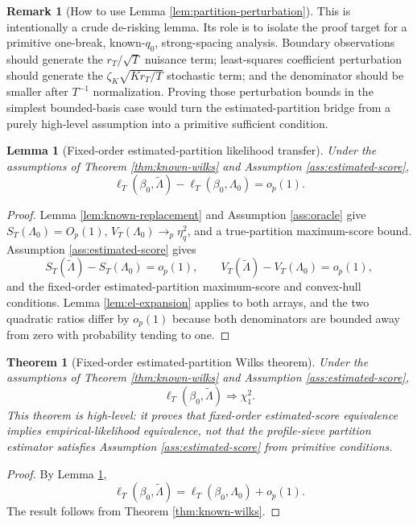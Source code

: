 \documentclass[12pt]{article}
\numberwithin{equation}{section}
\newtheorem{theorem}{Theorem}
\newtheorem{lemma}{Lemma}
\theoremstyle{definition}
\newtheorem{remark}{Remark}
\begin{document}
\begin{remark}[How to use Lemma \ref{lem:partition-perturbation}]
This is intentionally a crude de-risking lemma. Its role is to isolate the proof target for a primitive one-break, known-\(q_0\), strong-spacing analysis. Boundary observations should generate the \(r_T/\sqrt T\) nuisance term; least-squares coefficient perturbation should generate the \(\zeta_K\sqrt{K r_T/T}\) stochastic term; and the denominator should be smaller after \(T^{-1}\) normalization. Proving those perturbation bounds in the simplest bounded-basis case would turn the estimated-partition bridge from a purely high-level assumption into a primitive sufficient condition.
\end{remark}

\begin{lemma}[Fixed-order estimated-partition likelihood transfer]
\label{lem:estimated-transfer}
Under the assumptions of Theorem \ref{thm:known-wilks} and Assumption \ref{ass:estimated-score},
\[
    \ell_T(\beta_0,\widetilde\Lambda)
    -
    \ell_T(\beta_0,\Lambda_0)
    =o_p(1).
\]
\end{lemma}

\begin{proof}
Lemma \ref{lem:known-replacement} and Assumption \ref{ass:oracle} give \(S_T(\Lambda_0)=O_p(1)\), \(V_T(\Lambda_0)\to_p\eta_q^2\), and a true-partition maximum-score bound. Assumption \ref{ass:estimated-score} gives
\[
    S_T(\widetilde\Lambda)-S_T(\Lambda_0)=o_p(1),
    \qquad
    V_T(\widetilde\Lambda)-V_T(\Lambda_0)=o_p(1),
\]
and the fixed-order estimated-partition maximum-score and convex-hull conditions. Lemma \ref{lem:el-expansion} applies to both arrays, and the two quadratic ratios differ by \(o_p(1)\) because both denominators are bounded away from zero with probability tending to one.
\end{proof}

\begin{theorem}[Fixed-order estimated-partition Wilks theorem]
\label{thm:estimated-equiv}
Under the assumptions of Theorem \ref{thm:known-wilks} and Assumption \ref{ass:estimated-score},
\[
    \ell_T(\beta_0,\widetilde\Lambda)\Rightarrow\chi_1^2.
\]
This theorem is high-level: it proves that fixed-order estimated-score equivalence implies empirical-likelihood equivalence, not that the profile-sieve partition estimator satisfies Assumption \ref{ass:estimated-score} from primitive conditions.
\end{theorem}

\begin{proof}
By Lemma \ref{lem:estimated-transfer},
\[
    \ell_T(\beta_0,\widetilde\Lambda)
    =
    \ell_T(\beta_0,\Lambda_0)+o_p(1).
\]
The result follows from Theorem \ref{thm:known-wilks}.
\end{proof}
\end{document}
